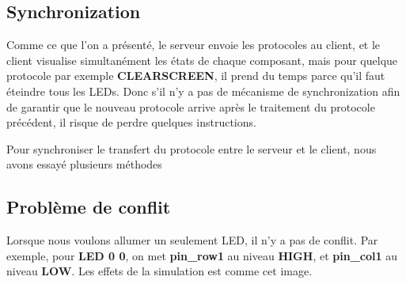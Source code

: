 \documentclass[14px]{article}
\begin{document}
\subsection{Synchronization}
Comme ce que l'on a présenté, le serveur envoie les protocoles au client, et le client visualise simultanément les états de chaque composant, mais pour quelque protocole par exemple \textbf{CLEARSCREEN}, il prend du temps parce qu'il faut éteindre tous les LEDs. Donc s'il n'y a pas de mécanisme de synchronization afin de garantir que le nouveau protocole arrive après le traitement du protocole précédent, il risque de perdre quelques instructions.

Pour synchroniser le transfert du protocole entre le serveur et le client, nous avons essayé plusieurs méthodes


\clearpage

\subsection{Problème de conflit}
Lorsque nous voulons allumer un seulement LED, il n'y a pas de conflit. Par exemple, pour \textbf{LED 0 0}, on met \textbf{pin\_row1} au niveau \textbf{HIGH}, et \textbf{pin\_col1} au niveau \textbf{LOW}. Les effets de la simulation est comme cet image.\\
\begin{figure}[htbp]
\end{figure}\\
\end{document}
